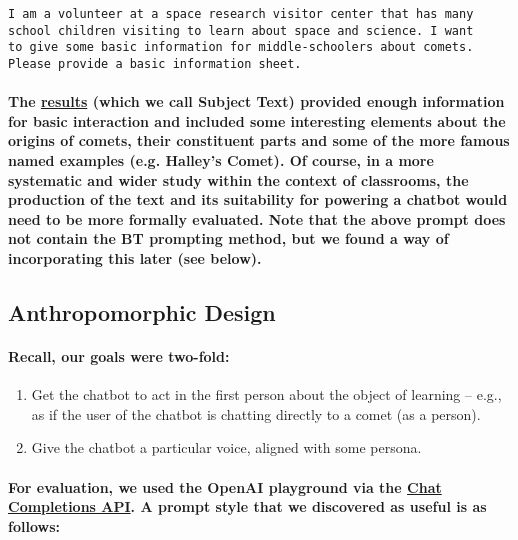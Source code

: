 \documentclass{article}
\begin{document}
\begin{verbatim}
I am a volunteer at a space research visitor center that has many
school children visiting to learn about space and science. I want
to give some basic information for middle-schoolers about comets.
Please provide a basic information sheet.
\end{verbatim}

\paragraph{The \href{https://github.com/yooleee/chatbot-research/blob/main/prompts/comet_content_response.txt}{results}
 (which we call Subject Text) provided enough information for basic interaction and included some interesting elements about the origins of comets, their constituent parts and some of the more famous named examples (e.g. Halley’s Comet). Of course, in a more systematic and wider study within the context of classrooms, the production of the text and its suitability for powering a chatbot would need to be more formally evaluated. Note that the above prompt does not contain the BT prompting method, but we found a way of incorporating this later (see below).}

\subsection*{Anthropomorphic Design}

\paragraph{Recall, our goals were two-fold:}

\begin{enumerate}
    \item Get the chatbot to act in the first person about the object of learning – e.g., as if the user of the chatbot is chatting directly to a comet (as a person).
    \item Give the chatbot a particular voice, aligned with some persona.
\end{enumerate}

\paragraph{For evaluation, we used the OpenAI playground via the \href{https://platform.openai.com/docs/guides/text-generation/chat-completions-api}{Chat Completions API}. A prompt style that we discovered as useful is as follows:}
\end{document}
